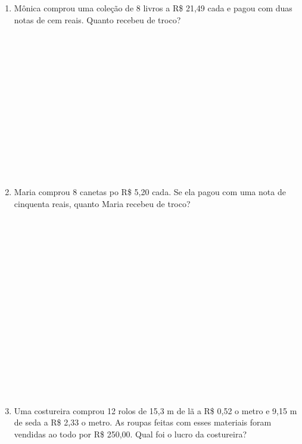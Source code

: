 \documentclass[a4paper,14pt]{article}
\begin{document}
\begin{multicols}{2}
\begin{enumerate}
    		\item Mônica comprou uma coleção de 8 livros a R\$ 21,49 cada e pagou com duas notas de cem reais. Quanto recebeu de troco? \\\\\\\\\\\\\\\\\\\\\\\\\\\\
    		\item Maria comprou 8 canetas po R\$ 5,20 cada. Se ela pagou com uma nota de cinquenta reais, quanto Maria recebeu de troco? \\\\\\\\\\\\\\\\\\\\\\\\\\\\\\\\\\
    		\item Uma costureira comprou 12 rolos de 15,3 m de lã a R\$ 0,52 o metro e 9,15 m de seda a R\$ 2,33 o metro. As roupas feitas com esses materiais foram vendidas ao todo por R\$ 250,00. Qual foi o lucro da costureira? \\\\\\\\\\\\\\\\\\\\\\\\

\end{enumerate}
\end{multicols}
\end{document}
